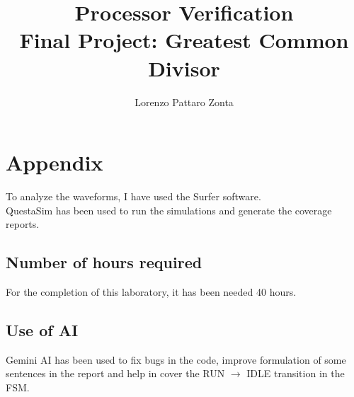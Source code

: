 \documentclass[titlepage]{article}
\title{Processor Verification \\Final Project: Greatest Common Divisor}
\author{Lorenzo Pattaro Zonta}
\begin{document}
\maketitle








\newpage
\section{Appendix}

To analyze the waveforms, I have used the Surfer software.\\
QuestaSim has been used to run the simulations and generate the coverage reports.

\subsection{Number of hours required}
For the completion of this laboratory, it has been needed 40 hours. 

\subsection{Use of AI}
Gemini AI has been used to fix bugs in the code, improve formulation of some sentences in the report and help in cover the RUN $\rightarrow$ IDLE transition in the FSM.
\end{document}
